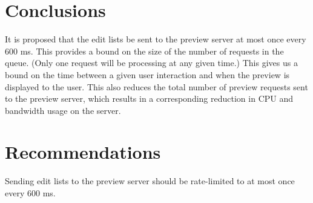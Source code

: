 \documentclass[se,resubmit]{uw-wkrpt}
\begin{document}
\section{Conclusions}
It is proposed that the edit lists be sent to the preview server at most
once every 600 ms. This provides a bound on the size of the number of
requests in the queue. (Only one request will be processing at any given
time.) This gives us a bound on the time between a given user interaction
and when the preview is displayed to the user. This also reduces the total
number of preview requests sent to the preview server, which results in a
corresponding reduction in CPU and bandwidth usage on the server.

\section{Recommendations}
Sending edit lists to the preview server should be rate-limited to at most
once every 600 ms.

\backmatter

%
\printbibliography[heading=bibintoc]
\end{document}
